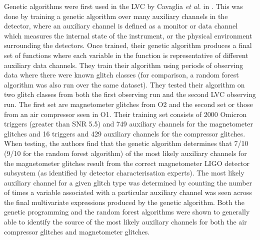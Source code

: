 %
%
Genetic algorithms were first used in the \ac{LVC} by 
Cavaglia \textit{et al.} in \cite{CiCP-25-963}. This was 
done by training a genetic algorithm over many auxiliary 
channels in the detector, 
where an auxiliary channel is defined as a monitor or data channel 
which measures the internal 
state of the instrument, or the physical environment surrounding the 
detectors. Once trained, their genetic algorithm produces a final set of 
functions where each variable in the function is representative of 
different auxiliary data channels. They train their algorithm 
using periods of observing data where there were known glitch 
classes (for comparison, a random forest algorithm was also run over the 
same dataset). They tested their algorithm on two glitch classes from 
both the first observing run and the second \ac{LVC} observing run. The 
first set are magnetometer glitches from O2 and the second 
set or those from an air compressor seen in O1. Their training set 
consists of 2000 Omicron triggers (greater than SNR 5.5) and 
749 auxiliary channels for the magnetometer glitches and 16 triggers and 
429 auxiliary channels for the compressor glitches. When testing, the 
authors find that the genetic algorithm determines that 7/10 (9/10 for 
the random forest algorithm) of the most likely auxiliary 
channels for the magnetometer glitches result from the 
correct magnetometer \ac{LIGO} detector subsystem (as identified by 
detector characterisation experts). The most likely 
auxiliary channel for a given glitch type was determined by counting 
the number of times a variable associated with a particular auxiliary channel 
was seen across the final multivariate expressions produced by the 
genetic algorithm.
Both the genetic programming and the 
random forest algorithms were shown to generally able to identify the source 
of the most likely auxiliary channels for both the air 
compressor glitches and magnetometer glitches.~ 

